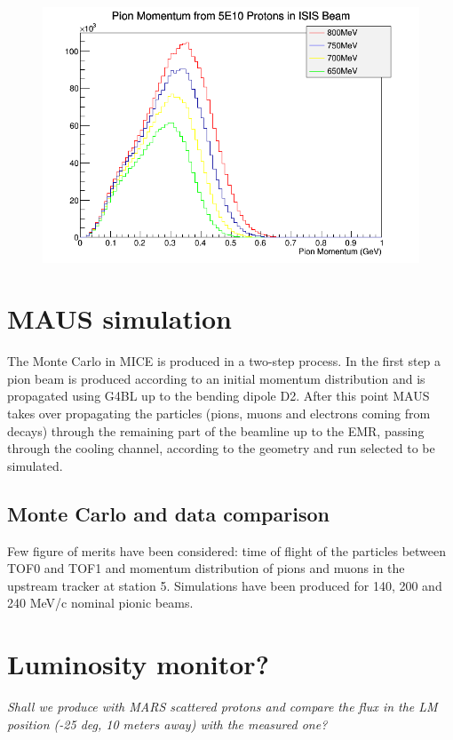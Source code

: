 \documentclass[a4paper,11pt]{article}
\begin{document}
\begin{figure}[t!]
  \begin{center}
    \includegraphics[width=1.0\columnwidth]{./figures/PiMomentum.png}
    \caption{}
    \label{fig:PiMomentum}
  \end{center}
\end{figure}


\section{MAUS simulation}

The Monte Carlo in MICE is produced in a two-step process. In the first step a pion beam is produced according to an initial momentum distribution and is propagated using G4BL up to the bending dipole D2. After this point MAUS takes over propagating the particles (pions, muons and electrons coming from decays) through the remaining part of the beamline up to the EMR, passing through the cooling channel, according to the geometry and run selected to be simulated. 

\subsection{Monte Carlo and data comparison}

Few figure of merits have been considered: time of flight of the particles between TOF0 and TOF1 and momentum distribution of pions and muons in the upstream tracker at station 5.
Simulations have been produced for 140, 200 and 240 MeV/c nominal pionic beams.

\section{Luminosity monitor?}
\textit{Shall we produce with MARS scattered protons and compare the flux in the LM position (-25 deg, 10 meters away) with the measured one?} 
\end{document}
